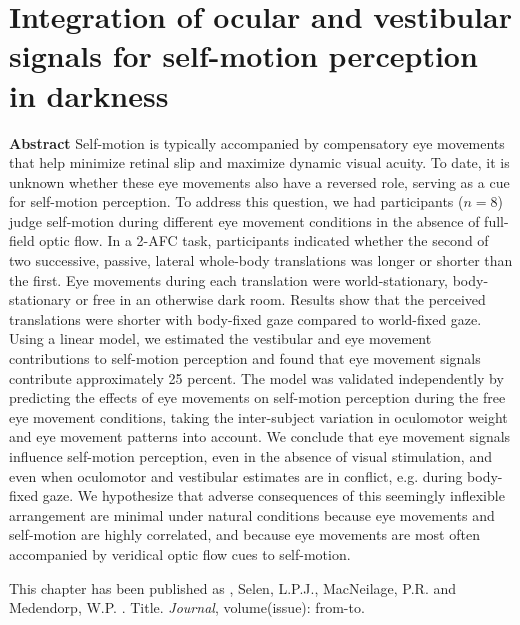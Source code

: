 
\thispagestyle{empty}

\chapter{Integration of ocular and vestibular signals for self-motion perception in darkness}
\chaptermark{}

\newpage

\small {\bf Abstract} Self-motion is typically accompanied by compensatory eye movements that help minimize retinal slip and maximize dynamic visual acuity. To date, it is unknown whether these eye movements also have a reversed role, serving as a cue for self-motion perception. To address this question, we had participants ($n=8$) judge self-motion during different eye movement conditions in the absence of full-field optic flow.  In a 2-AFC task, participants indicated whether the second of two successive, passive, lateral whole-body translations was longer or shorter than the first. Eye movements during each translation were world-stationary, body-stationary or free in an otherwise dark room. Results show that the perceived translations were shorter with body-fixed gaze compared to world-fixed gaze. Using a linear model, we estimated the vestibular and eye movement contributions to self-motion perception and found that eye movement signals contribute approximately 25 percent. The model was validated independently by predicting the effects of eye movements on self-motion perception during the free eye movement conditions, taking the inter-subject variation in oculomotor weight and eye movement patterns into account. We conclude that eye movement signals influence self-motion perception, even in the absence of visual stimulation, and even when oculomotor and vestibular estimates are in conflict, e.g. during body-fixed gaze. We hypothesize that adverse consequences of this seemingly inflexible arrangement are minimal under natural conditions because eye movements and self-motion are highly correlated, and because eye movements are most often accompanied by veridical optic flow cues to self-motion.

\vfill

\noindent\underline{ \hspace{4cm} }

\noindent This chapter has been published as \newline
{}, Selen, L.P.J., MacNeilage, P.R. and Medendorp, W.P. \citeyear{clemens2015a}. Title. \emph{Journal}, volume(issue): from-to. \newline

\newpage





